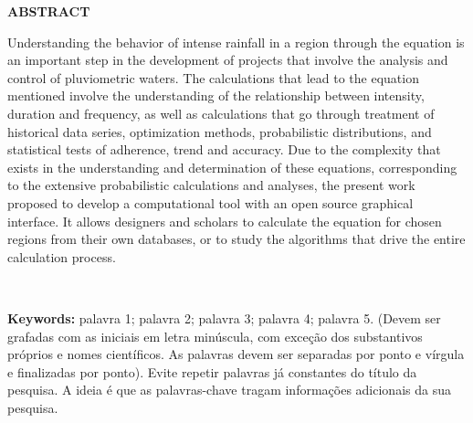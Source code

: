 \thispagestyle{empty}

\singlespacing
\begin{center}
	\textbf{ABSTRACT}
\end{center}

\noindent Understanding the behavior of intense rainfall in a region through the equation is an important step in the development of projects that involve the analysis and control of pluviometric waters. The calculations that lead to the equation mentioned involve the understanding of the relationship between intensity, duration and frequency, as well as calculations that go through treatment of historical data series, optimization methods, probabilistic distributions, and statistical tests of adherence, trend and accuracy. Due to the complexity that exists in the understanding and determination of these equations, corresponding to the extensive probabilistic calculations and analyses, the present work proposed to develop a computational tool with an open source graphical interface. It allows designers and scholars to calculate the equation for chosen regions from their own databases, or to study the algorithms that drive the entire calculation process.

\ \

\noindent \textbf{Keywords:} palavra 1; palavra 2; palavra 3; palavra 4; palavra 5. (Devem ser grafadas com as iniciais em letra minúscula, com exceção dos substantivos próprios e nomes científicos. As palavras devem ser separadas por ponto e vírgula e finalizadas por ponto). Evite repetir palavras já constantes do título da pesquisa. A ideia é que as palavras-chave tragam informações adicionais da sua pesquisa.
\newpage
